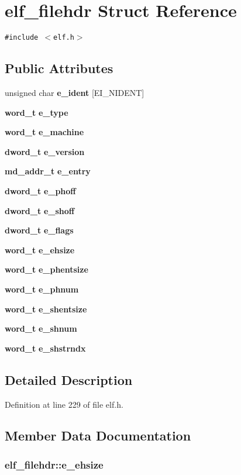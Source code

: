 \section{elf\_\-filehdr Struct Reference}
\label{structelf__filehdr}
{\tt \#include $<$elf.h$>$}

\subsection*{Public Attributes}
\begin{CompactItemize}
\item 
unsigned char {\bf e\_\-ident} [EI\_\-NIDENT]
\item 
{\bf word\_\-t} {\bf e\_\-type}
\item 
{\bf word\_\-t} {\bf e\_\-machine}
\item 
{\bf dword\_\-t} {\bf e\_\-version}
\item 
{\bf md\_\-addr\_\-t} {\bf e\_\-entry}
\item 
{\bf dword\_\-t} {\bf e\_\-phoff}
\item 
{\bf dword\_\-t} {\bf e\_\-shoff}
\item 
{\bf dword\_\-t} {\bf e\_\-flags}
\item 
{\bf word\_\-t} {\bf e\_\-ehsize}
\item 
{\bf word\_\-t} {\bf e\_\-phentsize}
\item 
{\bf word\_\-t} {\bf e\_\-phnum}
\item 
{\bf word\_\-t} {\bf e\_\-shentsize}
\item 
{\bf word\_\-t} {\bf e\_\-shnum}
\item 
{\bf word\_\-t} {\bf e\_\-shstrndx}
\end{CompactItemize}


\subsection{Detailed Description}


Definition at line 229 of file elf.h.

\subsection{Member Data Documentation}
\subsubsection[{e\_\-ehsize}]{ {\bf elf\_\-filehdr::e\_\-ehsize}}\label{structelf__filehdr_d101b3d51f0c51710be57af7038ec7fd}




